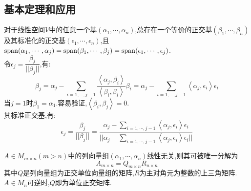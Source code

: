 \documentclass[UTF8,a4paper,notitlepage]{book}
\begin{document}
        \subsection{基本定理和应用}
        \begin{theorem}
            对于线性空间$V$中的任意一个基$(\alpha_1,\cdots,\alpha_n)$,总存在一个等价的正交基$(\beta_1,\cdots,\beta_n)$及其标准化的正交基$(\epsilon_1,\cdots,\epsilon_n)$,且$\mathrm{span}(\alpha_1,\cdots,\alpha_j)=\mathrm{span}(\beta_1,\cdots,\beta_j)=\mathrm{span}(\epsilon_1,\cdots,\epsilon_j)$.\\ 
            令$\epsilon_j=\dfrac{\beta_j}{||\beta_j||}$,有:$$\beta_j=\alpha_j-\sum_{i=1,\cdots,j-1}\frac{\left<\alpha_j,\beta_i\right>}{\left<\beta_i,\beta_i\right>}\beta_i=\alpha_j-\sum_{i=1,\cdots,j-1}\left<\alpha_j,\epsilon_i\right>\epsilon_i$$当$j=1$时$\beta_1=\alpha_1$.容易验证,$\left<\beta_i,\beta_j\right>=0$.\\ 
            其标准正交基,有:$$\epsilon_j=\frac{\beta_j}{||\beta_j||}=\frac{\alpha_j-\sum_{i=1,\cdots,j-1}\left<\alpha_j,\epsilon_i\right>\epsilon_i}{||\alpha_j-\sum_{i=1,\cdots,j-1}\left<\alpha_j,\epsilon_i\right>\epsilon_i||}$$
        \end{theorem}
        \begin{theorem}[QR-分解]
            $A\in M_{m\times n}(m>n)$中的列向量组$(\alpha_1,\cdots,\alpha_n)$线性无关,则其可被唯一分解为$$A_{m\times n}=Q_{m\times n}R_{n\times n}$$
            其中$Q$是列向量组为正交单位向量组的矩阵,$R$为主对角元为整数的上三角矩阵.\\ $A\in M_n$可逆时,$Q$即为单位正交矩阵.
        \end{theorem}
\end{document}
